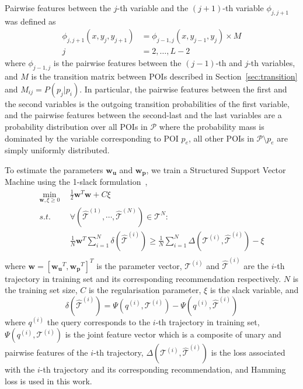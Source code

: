 {{Pairwise features between the $j$-th variable and the $(j+1)$-th variable $\phi_{j, j+1}$ was defined as
\begin{align*}
    \phi_{j, j+1}(x, y_j, y_{j+1}) &= \phi_{j-1, j}(x, y_{j-1}, y_j) \times M \\
                                 j &=2, \dots, L-2
\end{align*}
where $\phi_{j-1, j}$ is the pairwise features between the $(j-1)$-th and $j$-th variables,
and $M$ is the transition matrix between POIs described in Section~\ref{sec:transition} and
$M_{ij} = P(p_j | p_i)$.
In particular, the pairwise features between the first and the second variables is the
outgoing transition probabilities of the first variable,
and the pairwise features between the second-last and the last variables are a probability distribution
over all POIs in $\mathcal{P}$ where the probability mass is dominated by the variable corresponding to POI $p_e$,
all other POIs in $\mathcal{P} \setminus p_e$ are simply uniformly distributed.
}


To estimate the parameters $\mathbf{w_u}$ and $\mathbf{w_p}$, we train a Structured Support Vector Machine
using the 1-slack formulation~\cite{ssvm09},
\begin{align*}
    \min_{\mathbf{w}, \xi \ge 0} ~~& \frac{1}{2} \mathbf{w}^T \mathbf{w} + C \xi \\
    s.t. ~~& \forall \left( \hat{\mathcal{T}}^{(1)}, \cdots, \hat{\mathcal{T}}^{(N)} \right) \in \mathscr{T}^N: \\
         ~~& \frac{1}{N} \mathbf{w}^T \sum_{i=1}^N \delta \left( \hat{\mathcal{T}}^{(i)} \right) \ge
             \frac{1}{N} \sum_{i=1}^N \Delta \left( \mathcal{T}^{(i)}, \hat{\mathcal{T}}^{(i)} \right) - \xi \\
\end{align*}
where $\mathbf{w} = [\mathbf{w_u}^T, \mathbf{w_p}^T]^T$ is the parameter vector,
$\mathcal{T}^{(i)}$ and $\hat{\mathcal{T}}^{(i)}$ are the $i$-th trajectory in training set
and its corresponding recommendation respectively.
$N$ is the training set size, $C$ is the regularisation parameter,
$\xi$ is the slack variable, and
\begin{displaymath}
    \delta \left( \hat{\mathcal{T}}^{(i)} \right) = \Psi \left( q^{(i)}, \mathcal{T}^{(i)} \right) - 
                                                    \Psi \left( q^{(i)}, \hat{\mathcal{T}}^{(i)} \right)
\end{displaymath}
where $q^{(i)}$ the query corresponds to the $i$-th trajectory in training set,
$\Psi \left( q^{(i)}, \mathcal{T}^{(i)} \right)$ is the joint feature vector which is a composite of unary and 
pairwise features of the $i$-th trajectory,
$\Delta \left( \mathcal{T}^{(i)}, \hat{\mathcal{T}}^{(i)} \right)$ is the loss associated with the $i$-th trajectory 
and its corresponding recommendation, and Hamming loss is used in this work.



}
